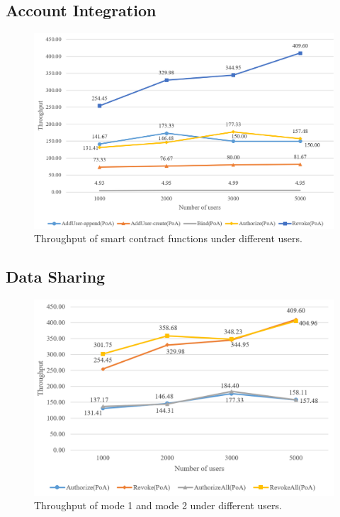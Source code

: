 \subsection*{Account Integration}
\begin{figure}[htb]
    \centering
    \includegraphics[height=!,width=1\linewidth,keepaspectratio=true]{figures/smart_contract_tps.png}
    \caption{{\footnotesize Throughput of smart contract functions under different users.}}
    \label{fig:contract_tps}
\end{figure}
\newpage

\subsection*{Data Sharing}



\begin{figure}[htb]
    \centering
    \includegraphics[height=!,width=1\linewidth,keepaspectratio=true]{figures/authorize_comparsion.png}
    \caption{{\footnotesize Throughput of mode 1 and mode 2 under different users.}}
    \label{fig:authorize_compare}
\end{figure}

